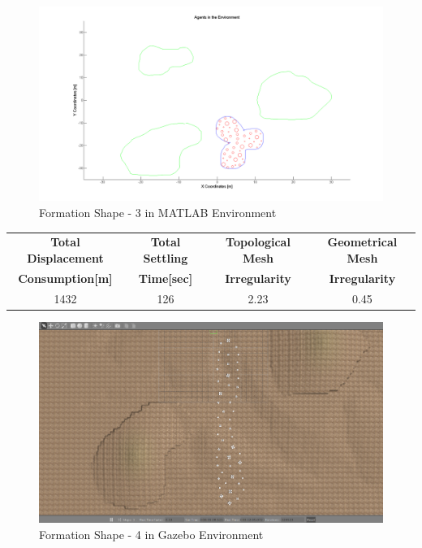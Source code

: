 \begin{figure}[H]
\caption{Formation Shape - 3 in MATLAB Environment}
\centerline{\includegraphics[scale = 0.40]{3}}
\end{figure} 
				 
\begin{center}
 \label{perf_shape3} 
\begin{tabular}{||c| c |c |c ||}
\hline
\textbf{Total Displacement }  & \textbf{Total Settling} & \textbf{Topological Mesh} & \textbf{Geometrical Mesh} \\ \textbf{Consumption[m]} & \textbf{Time[sec]}& \textbf{Irregularity} & \textbf{Irregularity} \\
\hline
1432 & 126 &  2.23& 0.45\\
\hline
\end{tabular}
\end{center}
				 
\begin{figure}[H]
\caption{Formation Shape - 4 in Gazebo Environment}
\centerline{\includegraphics[scale = 0.35]{4_Gazebo}}
\end{figure} 
			
